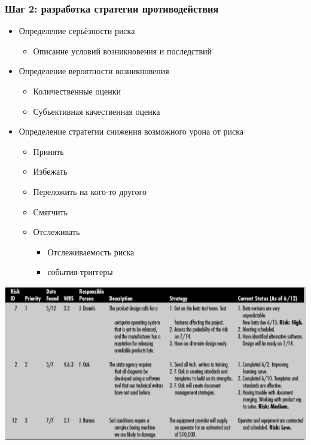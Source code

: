 \documentclass{../../slides-style}
\begin{document}
    \begin{frame}
        \frametitle{Шаг 2: разработка стратегии противодействия}
        \begin{itemize}
            \item Определение серьёзности риска
            \begin{itemize}
                \item Описание условий возникновения и последствий
            \end{itemize}
            \item Определение вероятности возникновения
            \begin{itemize}
                \item Количественные оценки
                \item Субъективная качественная оценка
            \end{itemize}
            \item Определение стратегии снижения возможного урона от риска
            \begin{itemize}
                \item Принять
                \item Избежать
                \item Переложить на кого-то другого
                \item Смягчить
                \item Отслеживать
                \begin{itemize}
                    \item Отслеживаемость риска
                    \item события-триггеры
                \end{itemize}
            \end{itemize}
        \end{itemize}
    \end{frame}

    \begin{frame}
        \begin{center}
            \includegraphics[width=\textwidth]{riskExample.png}
        \end{center}
    \end{frame}
\end{document}
